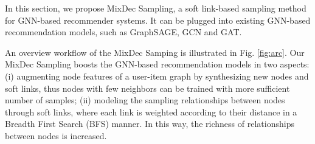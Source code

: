 

In this section, we propose MixDec Sampling, a soft link-based sampling method for GNN-based recommender systems. It can be plugged into existing GNN-based recommendation models, such as GraphSAGE, GCN and GAT.

An overview workflow of the MixDec Samping is illustrated in Fig. \ref{fig:arc}. Our MixDec Sampling boosts the GNN-based recommendation models in two aspects: (i) augmenting node features of a user-item graph by synthesizing new nodes and soft links, thus nodes with few neighbors can be trained with more sufficient number of samples; (ii) modeling the sampling relationships between nodes through soft links, where each link is weighted according to their distance in a Breadth First Search (BFS) manner. In this way, the richness of relationships between nodes is increased.

